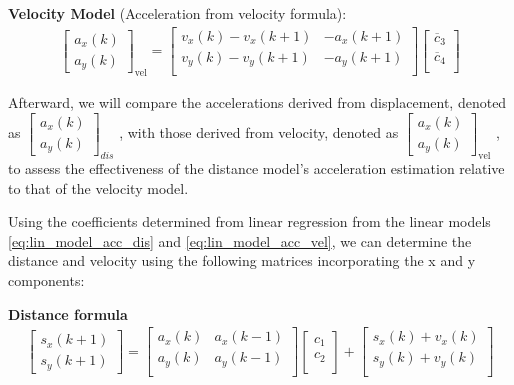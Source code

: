 \textbf{Velocity Model} (Acceleration from velocity formula):
\begin{align} \label{eq:lin_model_acc_vel}
    \begin{bmatrix}
        a_x(k) \\ 
        a_y(k) 
    \end{bmatrix}_{\text{vel}}
    =
    \begin{bmatrix}
        v_x(k) - v_x(k+1) & -a_x(k+1)    \\ 
        v_y(k) - v_y(k+1) & -a_y(k+1)    \\
    \end{bmatrix}
    \begin{bmatrix}
        \overline{c}_3 \\
        \overline{c}_4 \\
   \end{bmatrix}
\end{align}

\hfil

Afterward, we will compare the accelerations derived from displacement, denoted as 
$\begin{bmatrix} a_x(k) \\ a_y(k) \end{bmatrix}_{dis}$
, with those derived from velocity, denoted as 
$\begin{bmatrix} a_x(k) \\ a_y(k) \end{bmatrix}_{\text{vel}}$
, to assess the effectiveness of the distance model's acceleration estimation relative to that of the velocity model.


Using the coefficients determined from linear regression from the linear models \eqref{eq:lin_model_acc_dis} and \eqref{eq:lin_model_acc_vel}, we can determine the distance and velocity using the following matrices incorporating the x and y components:

\hfil

\textbf{Distance formula}
{\footnotesize
\begin{align}
\label{eq:distance_matrix}
    \begin{bmatrix}
        s_x(k+1) \\ 
        s_y(k+1) 
    \end{bmatrix}
    =
    \begin{bmatrix}
        a_x(k) & a_x(k-1)    \\ 
        a_y(k) & a_y(k-1)    \\
    \end{bmatrix}
    \begin{bmatrix}
        c_1 \\
        c_2 \\
    \end{bmatrix}
    +
    \begin{bmatrix}
        s_x(k) + v_x(k) \\ 
        s_y(k) + v_y(k) \\
    \end{bmatrix}
\end{align} 
}

